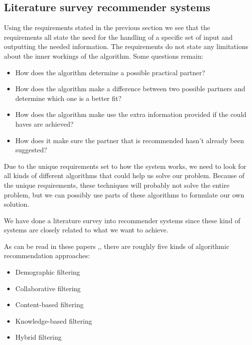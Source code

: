 \documentclass[]{article}
\begin{document}
\subsection{Literature survey recommender systems}
Using the requirements stated in the previous section we see that the requirements all state the need for the handling of a specific set of input and outputting the needed information.
The requirements do not state any limitations about the inner workings of the algorithm.
Some questions remain:
\begin{itemize}
\item How does the algorithm determine a possible practical partner?
\item How does the algorithm make a difference between two possible partners and determine which one is a better fit?
\item How does the algorithm make use the extra information provided if the could haves are achieved?
\item How does it make sure the partner that is recommended hasn't already been suggested?
\end{itemize}
Due to the unique requirements set to how the system works, we need to look for all kinds of different algorithms that could help us solve our problem.
Because of the unique requirements, these techniques will probably not solve the entire problem, but we can possibly use parts of these algorithms to formulate our own solution.

We have done a literature survey into recommender systems since these kind of systems are closely related to what we want to achieve.

As can be read in these papers \citep{Breese1998},\citep{Peter2007}, there are roughly five kinds of algorithmic recommendation approaches:

\begin{itemize}
\item Demographic filtering \citep{Peter2007}
\item Collaborative filtering \citep{Peter2007}\citep{Breese1998}
\item Content-based filtering \citep{Peter2007}
\item Knowledge-based filtering \citep{Peter2007}\cite{burke2000knowledge}
\item Hybrid filtering \citep{Peter2007}
\end{itemize}
\end{document}
